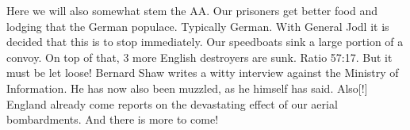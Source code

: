 Here we will also somewhat stem the AA. Our prisoners get better food and lodging that the German populace. Typically German. With General Jodl it is decided that this is to stop immediately. Our speedboats sink a large portion of a convoy. On top of that, 3 more English destroyers are sunk.  Ratio 57:17. But it must be let loose! Bernard Shaw writes a witty interview against the Ministry of Information. He has now also been muzzled, as he himself has said. Also[!] England already come reports on the devastating effect of our aerial bombardments. And there is more to come!